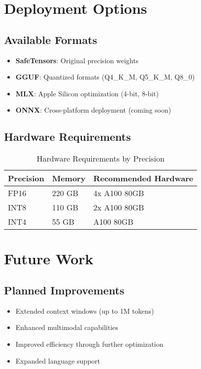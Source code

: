 \documentclass[11pt,a4paper]{article}
\begin{document}
\section{Deployment Options}

\subsection{Available Formats}
\begin{itemize}
    \item \textbf{SafeTensors}: Original precision weights
    \item \textbf{GGUF}: Quantized formats (Q4\_K\_M, Q5\_K\_M, Q8\_0)
    \item \textbf{MLX}: Apple Silicon optimization (4-bit, 8-bit)
    \item \textbf{ONNX}: Cross-platform deployment (coming soon)
\end{itemize}

\subsection{Hardware Requirements}
\begin{table}[H]
\centering
\begin{tabular}{lll}
\toprule
\textbf{Precision} & \textbf{Memory} & \textbf{Recommended Hardware} \\
\midrule
FP16 & 220 GB & 4x A100 80GB \\
INT8 & 110 GB & 2x A100 80GB \\
INT4 & 55 GB & A100 80GB \\
\bottomrule
\end{tabular}
\caption{Hardware Requirements by Precision}
\end{table}

\section{Future Work}

\subsection{Planned Improvements}
\begin{itemize}
    \item Extended context windows (up to 1M tokens)
    \item Enhanced multimodal capabilities
    \item Improved efficiency through further optimization
    \item Expanded language support
\end{itemize}
\end{document}
